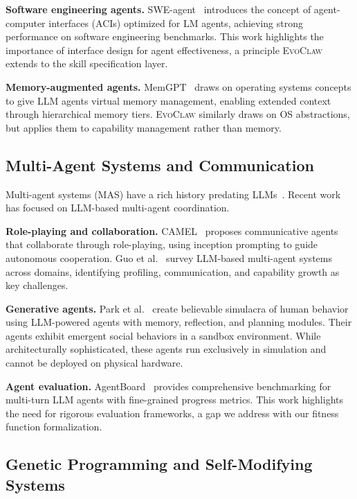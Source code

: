 \documentclass{article}
\newcommand{\evoclaw}{\textsc{EvoClaw}}
\begin{document}
\textbf{Software engineering agents.} SWE-agent~\cite{yang2024sweagent} introduces the concept of agent-computer interfaces (ACIs) optimized for LM agents, achieving strong performance on software engineering benchmarks. This work highlights the importance of interface design for agent effectiveness, a principle \evoclaw{} extends to the skill specification layer.

\textbf{Memory-augmented agents.} MemGPT~\cite{packer2023memgpt} draws on operating systems concepts to give LLM agents virtual memory management, enabling extended context through hierarchical memory tiers. \evoclaw{} similarly draws on OS abstractions, but applies them to capability management rather than memory.


\subsection{Multi-Agent Systems and Communication}

Multi-agent systems (MAS) have a rich history predating LLMs~\cite{wooldridge2009introduction}. Recent work has focused on LLM-based multi-agent coordination.

\textbf{Role-playing and collaboration.} CAMEL~\cite{li2023camel} proposes communicative agents that collaborate through role-playing, using inception prompting to guide autonomous cooperation. Guo et al.~\cite{guo2024llm_multi_agents} survey LLM-based multi-agent systems across domains, identifying profiling, communication, and capability growth as key challenges.

\textbf{Generative agents.} Park et al.~\cite{park2023generative} create believable simulacra of human behavior using LLM-powered agents with memory, reflection, and planning modules. Their agents exhibit emergent social behaviors in a sandbox environment. While architecturally sophisticated, these agents run exclusively in simulation and cannot be deployed on physical hardware.

\textbf{Agent evaluation.} AgentBoard~\cite{ma2024agentboard} provides comprehensive benchmarking for multi-turn LLM agents with fine-grained progress metrics. This work highlights the need for rigorous evaluation frameworks, a gap we address with our fitness function formalization.


\subsection{Genetic Programming and Self-Modifying Systems}
\end{document}
